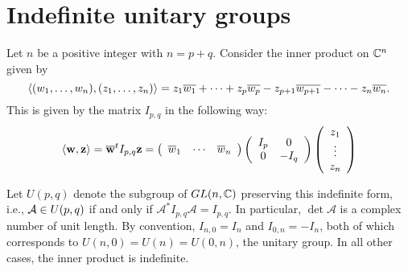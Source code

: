 \section{Indefinite unitary groups}\label{Sec: Upq}
\hfb Let $n$ be a positive integer with $n=p+q$. Consider the inner product on $\mathbb{C}^n$ given by
\begin{displaymath}
    \left\langle (w_1,\ldots,w_n),(z_1,\ldots,z_n)\right\rangle = z_1\overline{w_1}+\cdots+z_p\overline{w_p}-z_{p+1}\overline{w_{p+1}}-\cdots- z_n\overline{w_n}.
\end{displaymath}
This is given by the matrix $I_{p,q}$ in the following way:
\begin{displaymath}
    \left\langle \mathbf{w},\mathbf{z}\right\rangle=\overline{\mathbf{w}}^t I_{p,q} \mathbf{z}=\left(\begin{array}{ccc}
        \overline{w}_1 & \cdots & \overline{w}_n
        \end{array}\right)\left(\begin{array}{cc}
        I_p & 0 \\
        0 & -I_q
        \end{array}\right)\left(\begin{array}{c}
        z_1\\
        \vdots\\
        z_n
     \end{array}\right)
\end{displaymath}

\hf Let $U(p,q)$ denote the subgroup of $GL(n,\mathbb{C})$ preserving this indefinite form, i.e., $\mathcal{A}\in U(p,q)$ if and only if $\mathcal{A}^\ast I_{p,q}\mathcal{A}=I_{p,q}$. In particular, $\det \mathcal{A}$ is a complex number of unit length. By convention, $I_{n,0}=I_n$ and $ I_{0,n}=-I_n$, both of  which corresponds to $U(n,0)=U(n)=U(0,n)$, the unitary group. In all other cases, the inner product is indefinite.

